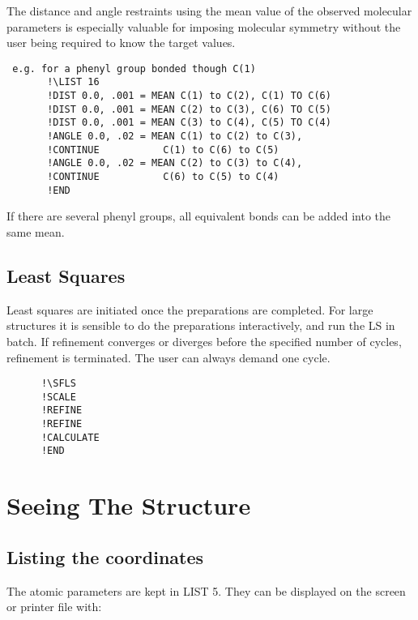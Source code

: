 \documentclass[10pt,a4paper]{report}
\begin{document}
The distance and angle restraints using the mean value of the observed
 molecular parameters is especially valuable for imposing molecular symmetry
 without the user being required to know the target values.

\small\begin{verbatim} e.g. for a phenyl group bonded though C(1)
       !\LIST 16
       !DIST 0.0, .001 = MEAN C(1) to C(2), C(1) TO C(6)
       !DIST 0.0, .001 = MEAN C(2) to C(3), C(6) TO C(5)
       !DIST 0.0, .001 = MEAN C(3) to C(4), C(5) TO C(4)
       !ANGLE 0.0, .02 = MEAN C(1) to C(2) to C(3),
       !CONTINUE           C(1) to C(6) to C(5)
       !ANGLE 0.0, .02 = MEAN C(2) to C(3) to C(4),
       !CONTINUE           C(6) to C(5) to C(4)
       !END
\end{verbatim}\normalsize


 If there are several phenyl groups, all equivalent bonds can be added into
 the same mean.



\section{Least Squares}



Least squares are initiated once the preparations are completed. For large
 structures it is sensible to do the preparations interactively, and run the
 LS in batch. If refinement converges or diverges before the specified
 number of cycles, refinement is terminated. The user can always demand one
 cycle.

\small\begin{verbatim}
      !\SFLS
      !SCALE
      !REFINE
      !REFINE
      !CALCULATE
      !END
\end{verbatim}\normalsize





\chapter{Seeing The Structure}


\section{Listing the coordinates}


The atomic parameters are kept in LIST 5. They can be displayed on the
 screen or printer file with:
\end{document}
